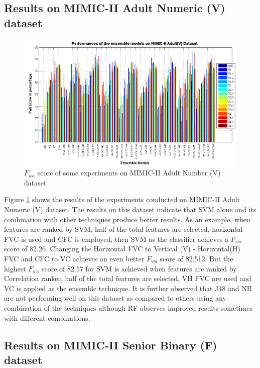\subsection{Results on MIMIC-II Adult Numeric (V) dataset}

\begin{figure}[h] 
	\centering 
	\includegraphics[scale=0.6]{fig/mimic2-adultk1v-full-table.png}
	\caption{$F_{wa}$ score of some experiments on MIMIC-II Adult Number (V) dataset}
	\label{F:MIMIC2_AdultK1V_Table}
\end{figure}

Figure \ref{F:MIMIC2_AdultK1V_Table} shows the results of the experiments conducted on MIMIC-II Adult Numeric (V) dataset. The results on this dataset indicate that SVM alone and its combination with other techniques produce better results. As an example, when features are ranked by SVM, half of the total features are selected, horizontal FVC is used and CFC is employed, then SVM as the classifier achieves a $F_{wa}$ score of 82.26. Changing the Horizontal FVC to Vertical (V) - Horizontal(H) FVC and CFC to VC achieves an even better $F_{wa}$ score of 82.512. But the highest  $F_{wa}$ score of 82.57 for SVM is achieved when features are ranked by Correlation ranker, half of the total features are selected, VH FVC are used and VC is applied as the ensemble technique. It is further observed that J48 and NB are not performing well on this dataset as compared to others using any combination of the techniques although RF observes improved results sometimes with different combinations.    

\subsection{Results on MIMIC-II Senior Binary (F) dataset}

